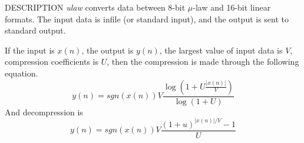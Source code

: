 % 
% 
% 
% 
%                                                                        
%

\begin{synopsis}
\item[ulaw] [ --v $V$ ] [ --u $U$ ] [ --c ] [ --d ] [ {\em infile} ]
\end{synopsis}

\begin{qsection}{DESCRIPTION}
{\em ulaw} converts data between 8-bit $\mu$-law and 16-bit linear formats.
The input data is {\rm infile} (or standard input), 
and the output is sent to standard output.

If the input is $x(n)$, the output is $y(n)$,
the largest value of input data is $V$, compression coefficients is $U$,
then the compression is made through the following equation.
\begin{displaymath}
y(n) = sgn(x(n)) V \frac{\log(1 + U \frac{|x(n)|}{V} )}{\log(1+U)}
\end{displaymath}
And decompression is
\begin{displaymath}
y(n) = sgn(x(n)) V \frac{(1+u)^{|x(n)|/V} - 1}{U}
\end{displaymath}
\end{qsection}

